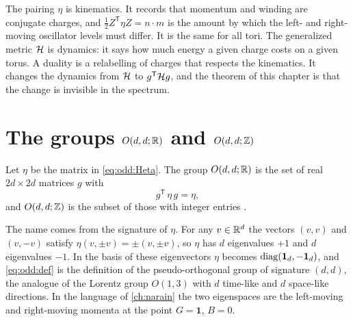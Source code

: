 \begin{physicsbox}
The pairing $\eta$ is kinematics. It records that momentum and winding are conjugate
charges, and $\frac12Z^{\mathsf T}\eta Z=n\cdot m$ is the amount by which the left- and
right-moving oscillator levels must differ. It is the same for all tori. The generalized
metric $\mathcal{H}$ is dynamics: it says how much energy a given charge costs on a given torus. A
duality is a relabelling of charges that respects the kinematics. It changes the dynamics
from $\mathcal{H}$ to $g^{\mathsf T}\mathcal{H} g$, and the theorem of this chapter is that the change is
invisible in the spectrum.
\end{physicsbox}

\section{The groups \texorpdfstring{$O(d,d;\mathbb{R})$}{O(d,d;R)} and
 \texorpdfstring{$O(d,d;\mathbb{Z})$}{O(d,d;Z)}}\label{sec:odd:group}

\begin{definition}\label{def:odd:group}
Let $\eta$ be the matrix in \eqref{eq:odd:Heta}. The group $O(d,d;\mathbb{R})$
is the set of real $2d\times2d$ matrices $g$ with
\begin{equation}\label{eq:odd:def}
 g^{\mathsf T}\,\eta\,g=\eta ,
\end{equation}
and $O(d,d;\mathbb{Z})$ is the subset of those with integer entries
.
\end{definition}

The name comes from the signature of $\eta$. For any $v\in\mathbb{R}^d$ the vectors $(v,v)$ and
$(v,-v)$ satisfy $\eta(v,\pm v)=\pm(v,\pm v)$, so $\eta$ has $d$ eigenvalues $+1$ and $d$
eigenvalues $-1$. In the basis of these eigenvectors $\eta$ becomes
$\operatorname{diag}(\mathbf 1_d,-\mathbf 1_d)$, and \eqref{eq:odd:def} is the definition of the
pseudo-orthogonal group of signature $(d,d)$, the analogue of the Lorentz group $O(1,3)$
with $d$ time-like and $d$ space-like directions. In the language of \cref{ch:narain} the
two eigenspaces are the left-moving and right-moving momenta at the point $G=\mathbf 1$,
$B=0$.

